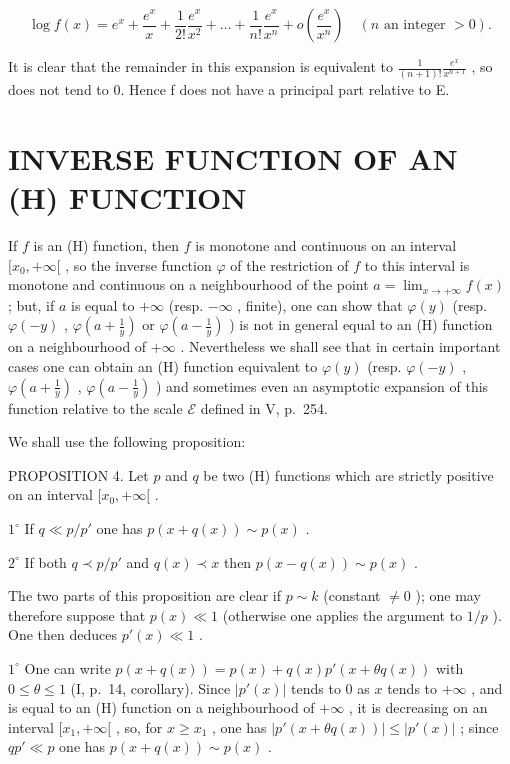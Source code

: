 \[
\log f (x) = e ^ {x} + \frac {e ^ {x}}{x} + \frac {1}{2 !} \frac {e ^ {x}}{x ^ {2}} + \dots + \frac {1}{n !} \frac {e ^ {x}}{x ^ {n}} + o \left(\frac {e ^ {x}}{x ^ {n}}\right) \quad (n \text {   an   integer   } > 0).
\]

It is clear that the remainder in this expansion is equivalent to \(\frac{1}{(n+1)!}\frac{e^{x}}{x^{n+1}}\) , so does not tend to 0. Hence f does not have a principal part relative to E.

\section{INVERSE FUNCTION OF AN (H) FUNCTION}

If \(f\) is an (H) function, then \(f\) is monotone and continuous on an interval \([x_0, +\infty[\) , so the inverse function \(\varphi\) of the restriction of \(f\) to this interval is monotone and continuous on a neighbourhood of the point \(a = \lim_{x \to +\infty} f(x)\) ; but, if \(a\) is equal to \(+\infty\) (resp. \(-\infty\) , finite), one can show that \(\varphi(y)\) (resp. \(\varphi(-y)\) , \(\varphi(a + \frac{1}{y})\) or \(\varphi(a - \frac{1}{y})\) ) is not in general equal to an (H) function on a neighbourhood of \(+\infty\) . Nevertheless we shall see that in certain important cases one can obtain an (H) function equivalent to \(\varphi(y)\) (resp. \(\varphi(-y)\) , \(\varphi(a + \frac{1}{y})\) , \(\varphi(a - \frac{1}{y})\) ) and sometimes even an asymptotic expansion of this function relative to the scale \(\mathcal{E}\) defined in V, p.~254.

We shall use the following proposition:

PROPOSITION 4. Let \(p\) and \(q\) be two (H) functions which are strictly positive on an interval \([x_0, +\infty[\) .

\(1^{\circ}\) If \(q \ll p / p'\) one has \(p(x + q(x)) \sim p(x)\) .

\(2^{\circ}\) If both \(q \prec p/p'\) and \(q(x) \prec x\) then \(p(x - q(x)) \sim p(x)\) .

The two parts of this proposition are clear if \(p \sim k\) (constant \(\neq 0\) ); one may therefore suppose that \(p(x) \ll 1\) (otherwise one applies the argument to \(1/p\) ). One then deduces \(p'(x) \ll 1\) .

\(1^{\circ}\) One can write \(p(x + q(x)) = p(x) + q(x)p'(x + \theta q(x))\) with \(0 \leqslant \theta \leqslant 1\) (I, p.~14, corollary). Since \(\left|p'(x)\right|\) tends to 0 as \(x\) tends to \(+\infty\) , and is equal to an (H) function on a neighbourhood of \(+\infty\) , it is decreasing on an interval \([x_1, +\infty[\) , so, for \(x \geqslant x_1\) , one has \(\left|p'(x + \theta q(x))\right| \leqslant \left|p'(x)\right|\) ; since \(qp' \ll p\) one has \(p(x + q(x)) \sim p(x)\) .

